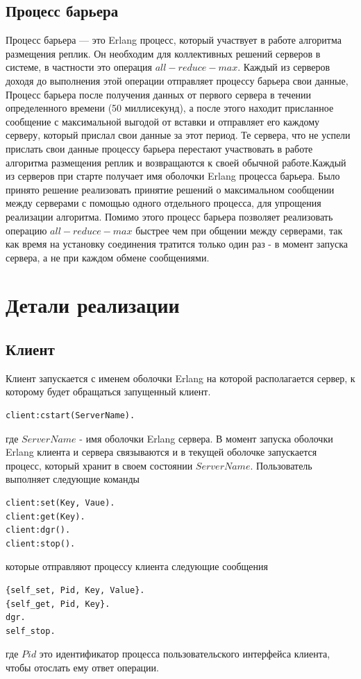 	\section{Процесс барьера}
		Процесс барьера --- это Erlang процесс, который участвует в работе алгоритма размещения реплик. Он необходим для коллективных решений серверов в системе,
		в частности это операция $all-reduce-max$. Каждый из серверов доходя до выполнения этой операции отправляет процессу барьера свои данные, Процесс барьера
		после получения данных от первого сервера в течении определенного времени (50 миллисекунд), а после этого находит присланное сообщение с максимальной 
		выгодой от вставки и отправляет его каждому серверу, который прислал свои данные за этот период. Те сервера, что не успели прислать свои данные процессу 
		барьера перестают участвовать в работе алгоритма размещения реплик и возвращаются к своей обычной работе.Каждый из серверов при старте получает имя оболочки
		Erlang процесса барьера. Было принято решение реализовать принятие решений о максимальном сообщении между серверами с помощью одного отдельного процесса,
		для упрощения реализации алгоритма. Помимо этого процесс барьера позволяет реализовать операцию $all-reduce-max$ быстрее чем при общении между серверами,
		так как время на установку соединения тратится только один раз - в момент запуска сервера, а не при каждом обмене сообщениями.
		

\newpage

\chapter{Детали реализации}
	\section{Клиент}
		Клиент запускается с именем оболочки Erlang на которой располагается сервер, к которому будет обращаться запущенный клиент.
		\begin{lstlisting}
client:cstart(ServerName).			
		\end{lstlisting}
		где $ServerName$ - имя оболочки Erlang сервера. В момент запуска оболочки Erlang клиента и сервера связываются и в текущей оболочке запускается процесс,
		который хранит в своем состоянии $ServerName$. Пользователь выполняет следующие команды
		\begin{lstlisting}
client:set(Key, Vaue).			
client:get(Key).			
client:dgr().			
client:stop().			
		\end{lstlisting}
		которые отправляют процессу клиента следующие сообщения
		\begin{lstlisting}
{self_set, Pid, Key, Value}.			
{self_get, Pid, Key}.			
dgr.			
self_stop.			
		\end{lstlisting}	
		где $Pid$ это идентификатор процесса пользовательского интерфейса клиента, чтобы отослать ему ответ операции. 
		
